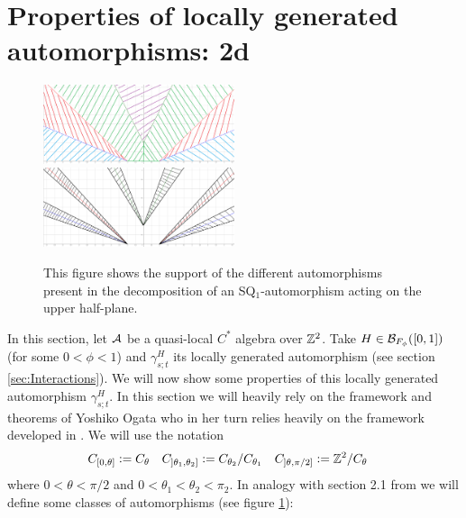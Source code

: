 \documentclass[11pt,a4paper,twoside]{article}
\numberwithin{equation}{section}
\begin{document}
	\section{Properties of locally generated automorphisms: 2d}\label{sec:properties-of-locally-generated-automorphisms-2d}
	\begin{figure}
		\includegraphics[width=0.5\textwidth]{Figures/AlphaFirstDecomposition2.png}
		\includegraphics[width=0.5\textwidth]{Figures/AlphaSecondDecomposition2.png}
		\caption{This figure shows the support of the different automorphisms present in the decomposition of an SQ$_1$-automorphism acting on the upper half-plane.}
		\label{fig:SetupSQAut2}
	\end{figure}
	In this section, let $\AA$ be a quasi-local $C^*$ algebra over $\ZZ^2$. Take $H\in\BB_{F_\phi}([0,1])$ (for some $0<\phi<1$) and $\gamma^H_{s;t}$ its locally generated automorphism (see section \ref{sec:Interactions}). We will now show some properties of this locally generated automorphism $\gamma^H_{s;t}$. In this section we will heavily rely on the framework and theorems of Yoshiko Ogata \cite{ogata2021h3gmathbb} who in her turn relies heavily on the framework developed in \cite{doi:10.1063/1.5095769}. We will use the notation
	\begin{align}
		C_{[0,\theta]}&\defeq C_{\theta}&C_{]\theta_1,\theta_2]}&\defeq C_{\theta_2}/C_{\theta_1}&C_{]\theta,\pi/2]}&\defeq \ZZ^2/C_{\theta}
	\end{align}
	where $0<\theta<\pi/2$ and $0<\theta_1<\theta_2<\pi_2$. In analogy with section 2.1 from \cite{ogata2021h3gmathbb} we will define some classes of automorphisms (see figure \ref{fig:SetupSQAut2}):
\end{document}

